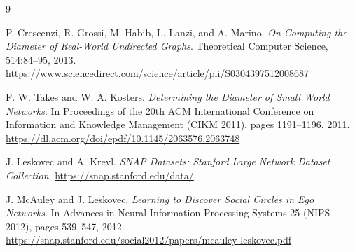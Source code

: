 \documentclass[11pt,a4paper]{article}
\begin{document}
\begin{thebibliography}{9}

P. Crescenzi, R. Grossi, M. Habib, L. Lanzi, and A. Marino.
\newblock \emph{On Computing the Diameter of Real-World Undirected Graphs}.
\newblock Theoretical Computer Science, 514:84--95, 2013.
\newblock \url{https://www.sciencedirect.com/science/article/pii/S0304397512008687}

F. W. Takes and W. A. Kosters.
\newblock \emph{Determining the Diameter of Small World Networks}.
\newblock In Proceedings of the 20th ACM International Conference on
Information and Knowledge Management (CIKM 2011), pages 1191--1196, 2011.
\newblock \url{https://dl.acm.org/doi/epdf/10.1145/2063576.2063748}

J. Leskovec and A. Krevl.
\newblock \emph{SNAP Datasets: Stanford Large Network Dataset Collection}.
\newblock \url{https://snap.stanford.edu/data/}

J. McAuley and J. Leskovec.
\newblock \emph{Learning to Discover Social Circles in Ego Networks}.
\newblock In Advances in Neural Information Processing Systems 25 (NIPS 2012),
pages 539--547, 2012.
\newblock \url{https://snap.stanford.edu/social2012/papers/mcauley-leskovec.pdf}

\end{thebibliography}
\end{document}
